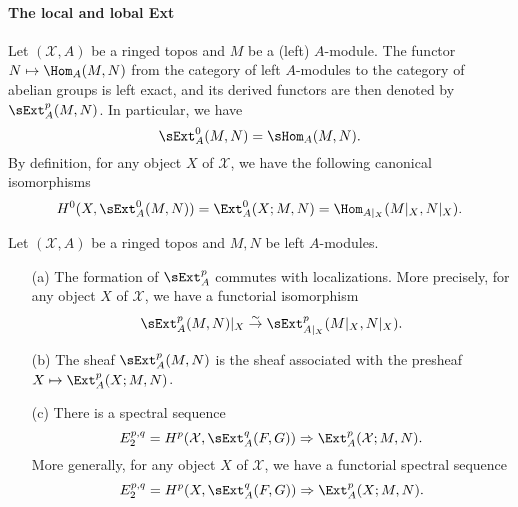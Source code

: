 \paragraph{The local and lobal Ext}
Let $(\mathcal{X},A)$ be a ringed topos and $M$ be a (left) $A$-module. The functor $N\mapsto\Hom_A(M,N)$ from the category of left $A$-modules to the category of abelian groups is left exact, and its derived functors are then denoted by $\sExt_A^p(M,N)$. In particular, we have
\[\sExt_A^0(M,N)=\sHom_A(M,N).\]
By definition, for any object $X$ of $\mathcal{X}$, we have the following canonical isomorphisms
\[H^0(X,\sExt_A^0(M,N))=\Ext_A^0(X;M,N)=\Hom_{A|_X}(M|_X,N|_X).\]

\begin{proposition}\label{ringed topos sExt porp}
Let $(\mathcal{X},A)$ be a ringed topos and $M,N$ be left $A$-modules.
\begin{enumerate}
    \item[(a)] The formation of $\sExt_A^p$ commutes with localizations. More precisely, for any object $X$ of $\mathcal{X}$, we have a functorial isomorphism
    \begin{equation}\label{ringed topos sExt porp-1}
        \sExt_A^p(M,N)|_X \stackrel{\sim}{\to } \sExt_{A|_X}^p(M|_X,N|_X).
    \end{equation}
    \item[(b)] The sheaf $\sExt_A^p(M,N)$ is the sheaf associated with the presheaf $X\mapsto\Ext_A^p(X;M,N)$.
    \item[(c)] There is a spectral sequence
    \begin{equation}\label{ringed topos sExt porp-2}
        E_2^{p,q}=H^p(\mathcal{X},\sExt_A^q(F,G))\Rightarrow \Ext_A^p(\mathcal{X};M,N).
    \end{equation}
    More generally, for any object $X$ of $\mathcal{X}$, we have a functorial spectral sequence
    \begin{equation}\label{ringed topos sExt porp-3}
        E_2^{p,q}=H^p(X,\sExt_A^q(F,G))\Rightarrow \Ext_A^p(X;M,N).
    \end{equation}
\end{enumerate}
\end{proposition}
